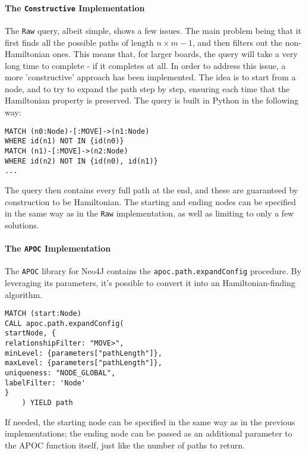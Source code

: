 \documentclass[conference]{IEEEtran}
\begin{document}
\paragraph{The \texttt{Constructive} Implementation}
The \texttt{Raw} query, albeit simple, shows a few issues. The main problem being that it first finds all the possible paths of length $n \times m - 1$, and then filters out the non-Hamiltonian ones. This means that, for larger boards, the query will take a very long time to complete - if it completes at all.
In order to address this issue, a more 'constructive' approach has been implemented. The idea is to start from a node, and to try to expand the path step by step, ensuring each time that the Hamiltonian property is preserved.
The query is built in Python in the following way:
\begin{tcolorbox}[colback=yellow!5!white, colframe=yellow!50!black]
\begin{verbatim}
MATCH (n0:Node)-[:MOVE]->(n1:Node)
WHERE id(n1) NOT IN {id(n0)}
MATCH (n1)-[:MOVE]->(n2:Node)
WHERE id(n2) NOT IN {id(n0), id(n1)}
...
\end{verbatim}
\end{tcolorbox}

The query then contains every full path at the end, and these are guaranteed by construction to be Hamiltonian.
The starting and ending nodes can be specified in the same way as in the \texttt{Raw} implementation, as well as limiting to only a few solutions.

\paragraph{The \texttt{APOC} Implementation}
The \texttt{APOC} library \cite{apoc} for Neo4J contains the \texttt{apoc.path.expandConfig} procedure. By leveraging its parameters, it's possible to convert it into an Hamiltonian-finding algorithm.
\begin{tcolorbox}[colback=yellow!5!white, colframe=yellow!50!black]
\begin{verbatim}
MATCH (start:Node)
CALL apoc.path.expandConfig(
startNode, {
relationshipFilter: "MOVE>",
minLevel: {parameters["pathLength"]},
maxLevel: {parameters["pathLength"]},
uniqueness: "NODE_GLOBAL",
labelFilter: 'Node'
}
    ) YIELD path
\end{verbatim}
\end{tcolorbox}

If needed, the starting node can be specified in the same way as in the previous implementations; the ending node can be passed as an additional parameter to the APOC function itself, just like the number of paths to return.
\end{document}
